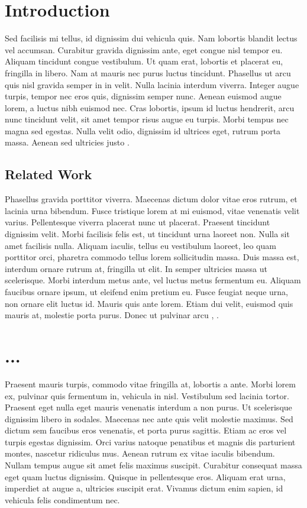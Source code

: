 \documentclass[
    a4paper,
    11pt,              %
    DIV10,             %
    BCOR12mm,           %
    headsepline,       %
    cleardoublepage=empty,  %
    listof=totoc,       %
    bibliography=totocnumbered,  %
    chapterprefix,     %
    appendixprefix,
    numbers=noenddot,  %
    captions=tableheading,  %
]{scrbook}             %
\theoremstyle{break}
\begin{document}
\chapter{Introduction}
Sed facilisis mi tellus, id dignissim dui vehicula quis. Nam lobortis blandit lectus vel accumsan. Curabitur gravida dignissim ante, eget congue nisl tempor eu. Aliquam tincidunt congue vestibulum. Ut quam erat, lobortis et placerat eu, fringilla in libero. Nam at mauris nec purus luctus tincidunt. Phasellus ut arcu quis nisl gravida semper in in velit. Nulla lacinia interdum viverra. Integer augue turpis, tempor nec eros quis, dignissim semper nunc. Aenean euismod augue lorem, a luctus nibh euismod nec. Cras lobortis, ipsum id luctus hendrerit, arcu nunc tincidunt velit, sit amet tempor risus augue eu turpis. Morbi tempus nec magna sed egestas. Nulla velit odio, dignissim id ultrices eget, rutrum porta massa. Aenean sed ultricies justo \cite{Gulati+Qin+:2020conformer}.

\section{Related Work}
Phasellus gravida porttitor viverra. Maecenas dictum dolor vitae eros rutrum, et lacinia urna bibendum. Fusce tristique lorem at mi euismod, vitae venenatis velit varius. Pellentesque viverra placerat nunc ut placerat. Praesent tincidunt dignissim velit. Morbi facilisis felis est, ut tincidunt urna laoreet non. Nulla sit amet facilisis nulla. Aliquam iaculis, tellus eu vestibulum laoreet, leo quam porttitor orci, pharetra commodo tellus lorem sollicitudin massa. Duis massa est, interdum ornare rutrum at, fringilla ut elit. In semper ultricies massa ut scelerisque. Morbi interdum metus ante, vel luctus metus fermentum eu. Aliquam faucibus ornare ipsum, ut eleifend enim pretium eu. Fusce feugiat neque urna, non ornare elit luctus id. Mauris quis ante lorem. Etiam dui velit, euismod quis mauris at, molestie porta purus. Donec ut pulvinar arcu \cite{hinton2012deep}, \cite{Bourlard+Morgan:1993, Renals+Morgan+:1991, WuSchusterChen+16}.


\chapter{...}
Praesent mauris turpis, commodo vitae fringilla at, lobortis a ante. Morbi lorem ex, pulvinar quis fermentum in, vehicula in nisl. Vestibulum sed lacinia tortor. Praesent eget nulla eget mauris venenatis interdum a non purus. Ut scelerisque dignissim libero in sodales. Maecenas nec ante quis velit molestie maximus. Sed dictum sem faucibus eros venenatis, et porta purus sagittis. Etiam ac eros vel turpis egestas dignissim. Orci varius natoque penatibus et magnis dis parturient montes, nascetur ridiculus mus. Aenean rutrum ex vitae iaculis bibendum. Nullam tempus augue sit amet felis maximus suscipit. Curabitur consequat massa eget quam luctus dignissim. Quisque in pellentesque eros. Aliquam erat urna, imperdiet at augue a, ultricies suscipit erat. Vivamus dictum enim sapien, id vehicula felis condimentum nec.
\end{document}
